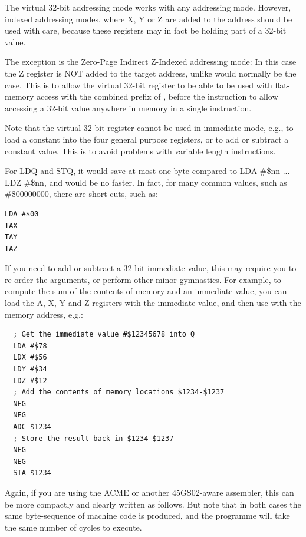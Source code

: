 The virtual 32-bit addressing mode works with any addressing mode.
However, indexed addressing modes, where X, Y or Z are added to the address should
be used with care, because these registers may in fact be holding part of a 32-bit value.

The exception is the Zero-Page
Indirect Z-Indexed addressing mode: In this case the Z register is NOT added to the target address, unlike would normally
be the case. This is to allow the virtual 32-bit register to be able to be used with flat-memory access with the combined prefix of
,  before the instruction to allow accessing a 32-bit value anywhere in memory in a single instruction.

Note that the virtual 32-bit register cannot be used in immediate mode, e.g., to load a constant into the four general
purpose registers, or to add or subtract a constant value.  This is to
avoid problems with variable length instructions.

For LDQ and STQ, it would save at most one byte
compared to LDA \#\$nn ... LDZ \#\$nn, and would be no faster.  In fact, for many common
values, such as \#\$00000000, there are short-cuts, such as:

\begin{tcolorbox}[colback=black,coltext=white]
\verbatimfont{\codefont}
\begin{verbatim}
LDA #$00
TAX
TAY
TAZ
\end{verbatim}
\end{tcolorbox}

If you need to add or subtract a 32-bit immediate value, this may require you to re-order the arguments, or perform other
minor gymnastics.  For example, to compute the sum of the contents of memory and an immediate value, you can load the A, X, Y
and Z registers with the immediate value, and then use  with the memory address, e.g.:

\begin{tcolorbox}[colback=black,coltext=white]
\verbatimfont{\codefont}
\begin{verbatim}
  ; Get the immediate value #$12345678 into Q
  LDA #$78
  LDX #$56
  LDY #$34
  LDZ #$12  
  ; Add the contents of memory locations $1234-$1237
  NEG
  NEG
  ADC $1234
  ; Store the result back in $1234-$1237
  NEG
  NEG
  STA $1234  
\end{verbatim}
\end{tcolorbox}

Again, if you are using the ACME or another 45GS02-aware assembler, this can be more compactly and
clearly written as follows. But note that in both cases the same byte-sequence of machine code is
produced, and the programme will take the same number of cycles to execute.


